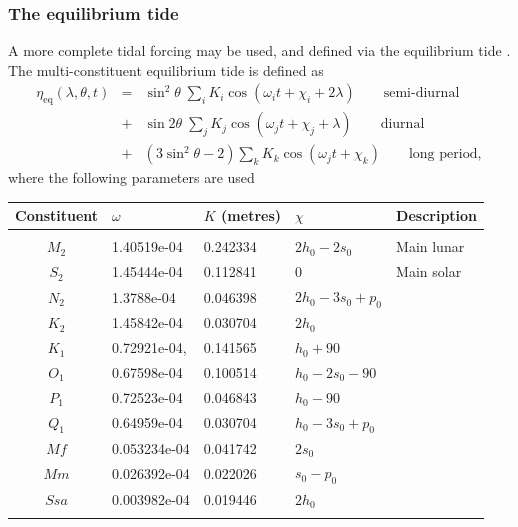 \subsubsection{The equilibrium tide}\label{sect:eqtd}
A more complete tidal forcing may be used, and defined via the equilibrium tide \cite{schwiderski1980}. The
multi-constituent equilibrium tide is defined as
{\setlength\arraycolsep{2pt}
\begin{eqnarray*}
\eta_{\mathrm{eq}}(\lambda,\theta,t) 
&=&\sin^2\theta\;\sum_iK_i\cos(\omega_i t +\chi_i + 2\lambda)\qquad\textrm{semi-diurnal}\\
&+&\sin 2\theta\;\sum_jK_j\cos(\omega_j t +\chi_j + \lambda)\qquad\textrm{diurnal}\\
&+&(3\sin^2 \theta - 2)\sum_kK_k\cos(\omega_j t +\chi_k)\qquad\textrm{long period},
\end{eqnarray*}}
where the following parameters are used
\begin{center}\begin{small}
\begin{tabular}{|c|l|l|l|l|} \hline
Constituent  &  $\omega$ & $K$ (metres) &   $\chi$ & Description  \\  \hline
    &  &  &  &   \\
 $M_2$  & 1.40519e-04 & 0.242334 & $2h_0 - 2s_0$  &  Main lunar\\
 $S_2$  & 1.45444e-04 & 0.112841 &  $0$ & Main solar\\
 $N_2$  & 1.3788e-04 & 0.046398 &  $2h_0 - 3s_0 + p_0$  &\\
 $K_2$  & 1.45842e-04 &  0.030704 & $2h_0$  &\\
 $K_1$  & 0.72921e-04, & 0.141565 & $h_0   + 90$ & \\
 $O_1$  & 0.67598e-04 & 0.100514 & $h_0 - 2s_0   - 90$  &\\
 $P_1$  & 0.72523e-04 & 0.046843 &  $h_0   - 90$ &\\
 $Q_1$  & 0.64959e-04 & 0.030704  & $h_0 - 3s_0 + p_0$ &\\
 $Mf$   & 0.053234e-04 & 0.041742 & $2s_0$  &\\
 $Mm$   & 0.026392e-04 & 0.022026 & $s_0 - p_0$ &\\
 $Ssa$  & 0.003982e-04 & 0.019446 & $2h_0$ & \\
    &  &  &  &  \\  \hline
\end{tabular}
\end{small}
\end{center}

